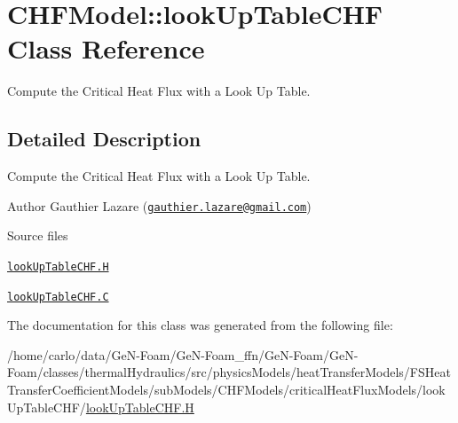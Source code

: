 \hypertarget{classFoam_1_1CHFModel_1_1lookUpTableCHF}{}\section{C\+H\+F\+Model\+:\+:look\+Up\+Table\+C\+HF Class Reference}
\label{classFoam_1_1CHFModel_1_1lookUpTableCHF}


Compute the Critical Heat Flux with a Look Up Table.  




\subsection{Detailed Description}
Compute the Critical Heat Flux with a Look Up Table. 

\label{_Description}%
 Author Gauthier Lazare (\href{mailto:gauthier.lazare@gmail.com}{\tt gauthier.\+lazare@gmail.\+com})

\begin{DoxyParagraph}{Source files}

\begin{DoxyItemize}
\item \href{../../../home/carlo/data/GeN-Foam/GeN-Foam_ffn/GeN-Foam/GeN-Foam/classes/thermalHydraulics/src/physicsModels/heatTransferModels/FSHeatTransferCoefficientModels/subModels/CHFModels/criticalHeatFluxModels/lookUpTableCHF/lookUpTableCHF.H}{\tt look\+Up\+Table\+C\+H\+F.\+H} 
\item \href{../../../home/carlo/data/GeN-Foam/GeN-Foam_ffn/GeN-Foam/GeN-Foam/classes/thermalHydraulics/src/physicsModels/heatTransferModels/FSHeatTransferCoefficientModels/subModels/CHFModels/criticalHeatFluxModels/lookUpTableCHF/lookUpTableCHF.C}{\tt look\+Up\+Table\+C\+H\+F.\+C} 
\end{DoxyItemize}
\end{DoxyParagraph}


The documentation for this class was generated from the following file\+:\begin{DoxyCompactItemize}
\item 
/home/carlo/data/\+Ge\+N-\/\+Foam/\+Ge\+N-\/\+Foam\+\_\+ffn/\+Ge\+N-\/\+Foam/\+Ge\+N-\/\+Foam/classes/thermal\+Hydraulics/src/physics\+Models/heat\+Transfer\+Models/\+F\+S\+Heat\+Transfer\+Coefficient\+Models/sub\+Models/\+C\+H\+F\+Models/critical\+Heat\+Flux\+Models/look\+Up\+Table\+C\+H\+F/\hyperlink{lookUpTableCHF_8H}{look\+Up\+Table\+C\+H\+F.\+H}\end{DoxyCompactItemize}
